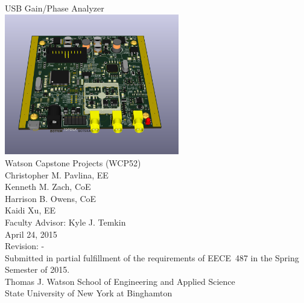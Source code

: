 \begin{titlingpage}
\begin{vplace}[0.5]
\begin{center}
{\Huge USB Gain/Phase Analyzer} \\
\includegraphics[width=3in]{full3d.png} \\
{\Huge Watson Capstone Projects (WCP52)} \\ \vspace{1cm}
{\Huge Christopher M. Pavlina, EE} \\
{\Huge Kenneth M. Zach, CoE} \\
{\Huge Harrison B. Owens, CoE} \\
{\Huge Kaidi Xu, EE} \\ \vspace{1cm}
{\Huge Faculty Advisor: Kyle J. Temkin} \\ \vspace{1cm}
{\Huge April 24, 2015} \\
{\Huge Revision: -} \\ \vspace{1cm}
{Submitted in partial fulfillment of the requirements of EECE~487 in the Spring Semester of 2015.} \\ \vspace{1cm}
{Thomas J. Watson School of Engineering and Applied Science} \\
{State University of New York at Binghamton} \\
\end{center}
\end{vplace}
\end{titlingpage}

